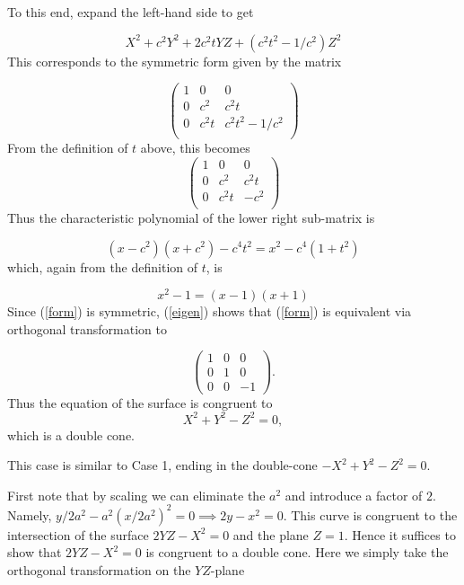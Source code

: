 \documentclass[12pt]{article}
\begin{document}
To this end, expand the left-hand side to get

$$X^2 + c^2 Y^2 + 2c^2t YZ + (c^2t^2 - 1/c^2 )Z^2$$
This corresponds to the symmetric form given by the matrix 

\begin{equation}\label{form}\left(
\begin{matrix} 
1 & 0 & 0 \\
0 & c^2 & c^2t \\
0 & c^2 t& c^2t^2 - 1/c^2 \\
\end{matrix}
\right)
\end{equation} 
From the definition of $t$ above, this becomes
$$\left(
\begin{matrix}
1 & 0 & 0 \\
0 & c^2 & c^2 t\\
0 & c^2 t& -c^2\\
\end{matrix}
\right)$$
Thus the characteristic polynomial of the lower right sub-matrix is

$$( x - c^2)(x + c^2) -  c^4 t^2 = x^2 - c^4(1 + t^2)$$
which, again from the definition of $t$, is

\begin{equation}\label{eigen} x^2  -1 = (x - 1)(x + 1)\end{equation}
Since (\ref{form}) is symmetric, (\ref{eigen}) shows that (\ref{form}) is
equivalent via orthogonal transformation to

$$\left(\begin{matrix}1 & 0 & 0 \\
0 & 1 & 0\\
0 & 0 & -1\end{matrix}\right).$$
Thus the equation of the surface is congruent to
$$X^2 + Y^2 - Z^2 = 0,$$
which is a double cone.

\medskip

 This case is similar to Case 1, ending in the
double-cone $-X^2 + Y^2 - Z^2 = 0$.

\medskip

 First note that by scaling 
we can eliminate the $a^2$ and introduce a factor of $2$.  Namely,
$y/2a^2 - a^2(x/2a^2)^2  = 0\implies 2y
- x^2 = 0$.  This curve is congruent to the intersection of
the surface $2YZ - X^2 = 0$ and the plane $Z = 1$.  Hence it suffices
to show that $2YZ - X^2 = 0$ is congruent to a double cone.  
Here we simply take the orthogonal transformation on the
$YZ$-plane
\end{document}
